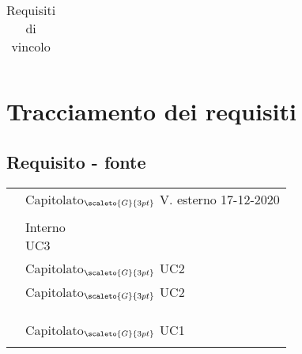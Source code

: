 {{{{\begin{center}
\begin{longtable}{|p{3cm}|p{4cm}|p{4cm}|p{4cm}|}
		\caption[Requisiti di vincolo]{Requisiti di vincolo}\label{4.4}\\
	\end{longtable}
\end{center}

\section{Tracciamento dei requisiti}\label{RequisitiTracciamentoDeiRequisiti}

\subsection{Requisito - fonte}\label{RequisitiTracciamentoDeiRequisitiFonte}

\def\tabularxcolumn#1{m{#1}}
{
	\begin{center}
		\renewcommand{\arraystretch}{1.4}
		\begin{longtable}{|p{7.5cm}|p{7.5cm}|}
		\hline
		\rowcolor{airforceblue}
		\makecell[tc]{\textbf{Codice RS}} & \makecell[c]{\textbf{Fonte}}  \\
		\hline
		\makecell[tc]{RSFO1} & \makecell[tc]{Capitolato$_{\scaleto{G}{3pt}}$\\V. esterno 17-12-2020} \\
		\hline
		\makecell[tc]{RSFF2} & \makecell[tc]{Capitolato$_{\scaleto{G}{3pt}}$}\\
		\hline
		\makecell[tc]{RSFO3.1} & \makecell[tc]{Interno \\ UC3}\\
		\hline
		\makecell[tc]{RSFO4.1} & \makecell[tc]{Capitolato$_{\scaleto{G}{3pt}}$\\UC2}\\
		\hline
		\makecell[tc]{RSFO4.2} & \makecell[tc]{Capitolato$_{\scaleto{G}{3pt}}$\\UC2}\\
		\hline
		\makecell[tc]{RSFO5} & \makecell[tc]{Capitolato$_{\scaleto{G}{3pt}}$}\\
		\hline
		\makecell[tc]{RSFO5.1} & \makecell[tc]{Capitolato$_{\scaleto{G}{3pt}}$}\\ 
		\hline
		\makecell[tc]{RSFD6}& \makecell[tc]{Capitolato$_{\scaleto{G}{3pt}}$}\\
		\hline
		\makecell[tc]{RSFO7} & \makecell[tc]{Capitolato$_{\scaleto{G}{3pt}}$\\UC1}\\
		\hline
		\makecell[tc]{RSFO8} & \makecell[tc]{Interno}\\ 

\end{longtable}
\end{center}}}}}}
